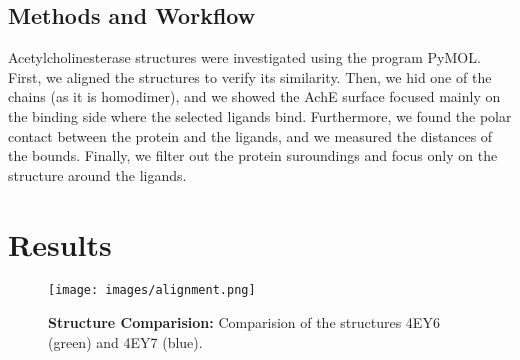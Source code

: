 \documentclass[10pt,a4paper,twocolumn]{article}
\begin{document}
\subsection*{Methods and Workflow}
Acetylcholinesterase structures were investigated using the program PyMOL. First, 
we aligned the structures to verify its similarity. Then, we hid one of the 
chains (as it is homodimer), and we showed the AchE 
surface focused mainly on the binding side where the selected
ligands bind. Furthermore, we found the polar contact between the protein and 
the ligands, and we measured the distances of the bounds. 
Finally, we filter out the protein suroundings and focus only on the 
structure around the ligands.



\section*{Results}

\begin{figure}[tb]
  \centering
  \texttt{[image: images/alignment.png]}
  \caption{\textbf{Structure Comparision:} 
  Comparision of the structures 4EY6 (green) and 4EY7 (blue).}
  \label{fig:map_variants}
\end{figure} 










\clearpage


\end{document}
